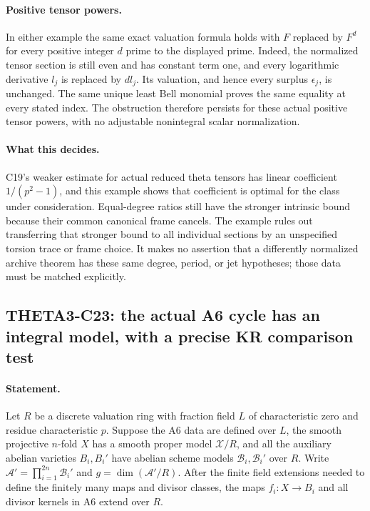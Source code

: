 \documentclass[11pt]{article}
\theoremstyle{definition}\newtheorem{definition}[theorem]{Definition}\newtheorem{remark}[theorem]{Remark}
\begin{document}
\paragraph{Positive tensor powers.}
In either example the same exact valuation formula holds
with $F$ replaced by $F^d$ for every positive integer $d$
prime to the displayed prime.  Indeed, the normalized
tensor section is still even and has constant term one,
and every logarithmic derivative $l_j$ is replaced by
$d l_j$.  Its valuation, and hence every surplus
$\epsilon_j$, is unchanged.  The same unique least
Bell monomial proves the same equality at every stated
index.  The obstruction therefore persists for these
actual positive tensor powers, with no adjustable
nonintegral scalar normalization.

\paragraph{What this decides.}
C19's weaker estimate for actual reduced theta tensors has
linear coefficient $1/(p^2-1)$, and this example shows that
coefficient is optimal for the class under consideration.
Equal-degree ratios still have the stronger intrinsic bound
because their common canonical frame cancels.
The example rules out transferring that stronger bound to
all individual sections by an unspecified torsion trace or
frame choice.  It makes no assertion that a differently
normalized archive theorem has these same degree, period,
or jet hypotheses; those data must be matched explicitly.


\subsection{THETA3-C23: the actual A6 cycle has an integral model, with a precise KR comparison test}\label{C23}

\paragraph{Statement.}
Let $R$ be a discrete valuation ring with fraction field $L$
of characteristic zero and residue characteristic $p$.
Suppose the A6 data are defined over $L$, the smooth projective
$n$-fold $X$ has a smooth proper model $\mathcal X/R$, and
all the auxiliary abelian varieties $B_i,B_i'$ have abelian
scheme models $\mathcal B_i,\mathcal B_i'$ over $R$.
Write $\mathcal A'=\prod_{i=1}^{2n}\mathcal B_i'$ and
$g=\dim(\mathcal A'/R)$.
After the finite field extensions needed to define the finitely
many maps and divisor classes, the maps $f_i:X\to B_i$ and
all divisor kernels in A6 extend over $R$.
\end{document}
